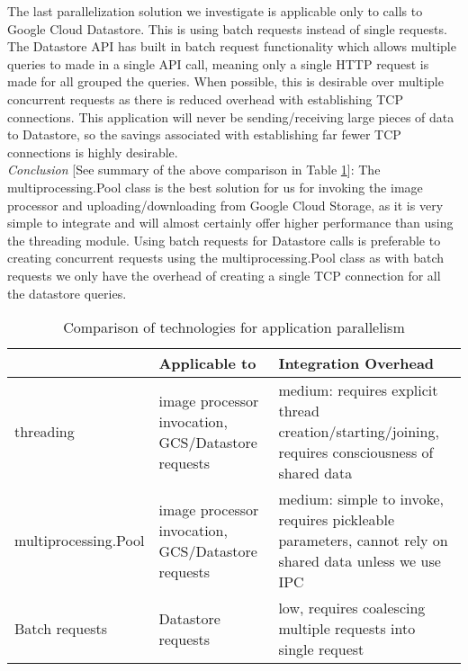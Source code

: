 \documentclass[10pt, onecolumn, draftclsnofoot, letterpaper, compsoc]{IEEEtran}
\begin{document}
The last parallelization solution we investigate is applicable only to calls to 
Google Cloud Datastore. This is using batch requests instead of single requests. 
The Datastore API has built in batch request functionality which allows multiple 
queries to made in a single API call, meaning only a single HTTP request is made 
for all grouped the queries\cite{batches}. When possible, this is desirable over 
multiple concurrent requests as there is reduced overhead with establishing 
TCP connections. This application will never be sending/receiving large 
pieces of data to Datastore, so the savings associated with establishing 
far fewer TCP connections is highly desirable. \\

\textit{Conclusion} [See summary of the above comparison in Table \ref{table:bret3}]:
The multiprocessing.Pool class is the best solution for us 
for invoking the image processor and uploading/downloading from Google Cloud 
Storage, as it is very simple to integrate and will almost certainly offer 
higher performance than using the threading module. Using batch requests for 
Datastore calls is preferable to creating concurrent requests using the 
multiprocessing.Pool class as with batch requests we only have the overhead 
of creating a single TCP connection for all the datastore queries. \\

\begin{table}[h]
\centering
\caption{Comparison of technologies for application parallelism}
\begin{tabular}{|p{4.2cm}|p{4.2cm}|p{4.2cm}|}
\cline{3-3}
\hline

 & Applicable to & Integration Overhead \\ \hline

threading & image processor invocation, GCS/Datastore requests 
& medium: requires explicit thread creation/starting/joining, 
requires consciousness of shared data \\ \hline

multiprocessing.Pool & image processor invocation, GCS/Datastore requests
& medium: simple to invoke, requires pickleable parameters, cannot rely 
on shared data unless we use IPC \\ \hline

Batch requests & Datastore requests & low, requires coalescing multiple 
requests into single request  \\ \hline

\end{tabular}
\label{table:bret3}
\end{table}
\end{document}
